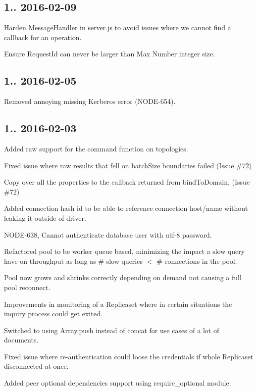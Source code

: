 \subsection*{1.. 2016-\/02-\/09 }


\begin{DoxyItemize}
\item Harden Message\+Handler in server.\+js to avoid issues where we cannot find a callback for an operation.
\item Ensure Request\+Id can never be larger than Max Number integer size.
\end{DoxyItemize}

\subsection*{1.. 2016-\/02-\/05 }


\begin{DoxyItemize}
\item Removed annoying missing Kerberos error (N\+O\+D\+E-\/654).
\end{DoxyItemize}

\subsection*{1.. 2016-\/02-\/03 }


\begin{DoxyItemize}
\item Added raw support for the command function on topologies.
\item Fixed issue where raw results that fell on batch\+Size boundaries failed (Issue \#72)
\item Copy over all the properties to the callback returned from bind\+To\+Domain, (Issue \#72)
\item Added connection hash id to be able to reference connection host/name without leaking it outside of driver.
\item N\+O\+D\+E-\/638, Cannot authenticate database user with utf-\/8 password.
\item Refactored pool to be worker queue based, minimizing the impact a slow query have on throughput as long as \# slow queries $<$ \# connections in the pool.
\item Pool now grows and shrinks correctly depending on demand not causing a full pool reconnect.
\item Improvements in monitoring of a Replicaset where in certain situations the inquiry process could get exited.
\item Switched to using Array.\+push instead of concat for use cases of a lot of documents.
\item Fixed issue where re-\/authentication could loose the credentials if whole Replicaset disconnected at once.
\item Added peer optional dependencies support using require\+\_\+optional module.
\end{DoxyItemize}


